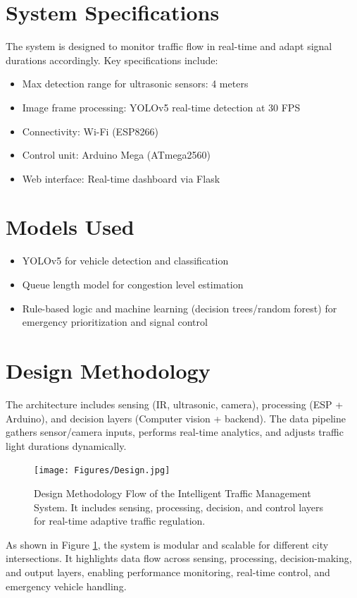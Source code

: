 \documentclass[12pt]{report}
\begin{document}
\section{System Specifications}
The system is designed to monitor traffic flow in real-time and adapt signal durations accordingly. Key specifications include:
\begin{itemize}
\item Max detection range for ultrasonic sensors: 4 meters
\item Image frame processing: YOLOv5 real-time detection at 30 FPS
\item Connectivity: Wi-Fi (ESP8266)
\item Control unit: Arduino Mega (ATmega2560)
\item Web interface: Real-time dashboard via Flask
\end{itemize}

\section{Models Used}
\begin{itemize}
\item YOLOv5 for vehicle detection and classification
\item Queue length model for congestion level estimation
\item Rule-based logic and machine learning (decision trees/random forest) for emergency prioritization and signal control
\end{itemize}

\section{Design Methodology}
The architecture includes sensing (IR, ultrasonic, camera), processing (ESP + Arduino), and decision layers (Computer vision + backend). The data pipeline gathers sensor/camera inputs, performs real-time analytics, and adjusts traffic light durations dynamically.

\begin{figure}[H]
\centering
\texttt{[image: Figures/Design.jpg]}
\caption{Design Methodology Flow of the Intelligent Traffic Management System. It includes sensing, processing, decision, and control layers for real-time adaptive traffic regulation.}
\label{fig:design_flow}
\end{figure}

As shown in Figure \ref{fig:design_flow}, the system is modular and scalable for different city intersections. It highlights data flow across sensing, processing, decision-making, and output layers, enabling performance monitoring, real-time control, and emergency vehicle handling.
\end{document}
